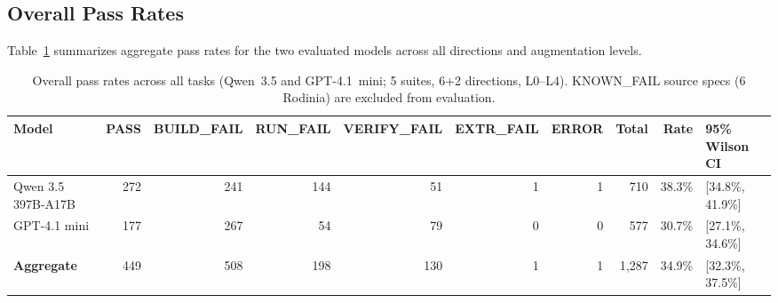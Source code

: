 \documentclass[conference]{IEEEtran}
\begin{document}
\subsection{Overall Pass Rates}
\label{sec:overall-pass}

Table~\ref{tab:overall-pass} summarizes aggregate pass rates for the two evaluated models across all directions and augmentation levels.

\begin{table}[t]
\centering
\caption{Overall pass rates across all tasks (Qwen~3.5 and GPT-4.1~mini; 5 suites, 6+2 directions, L0--L4). KNOWN\_FAIL source specs (6 Rodinia) are excluded from evaluation.}
\label{tab:overall-pass}
\small
\begin{tabular}{@{}lrrrrrrrrl@{}}
\toprule
Model & PASS & BUILD\_FAIL & RUN\_FAIL & VERIFY\_FAIL & EXTR\_FAIL & ERROR & Total & Rate & 95\% Wilson CI \\
\midrule
Qwen 3.5 397B-A17B & 272 & 241 & 144 & 51 & 1 & 1 & 710 & 38.3\% & [34.8\%, 41.9\%] \\ %
GPT-4.1 mini & 177 & 267 & 54 & 79 & 0 & 0 & 577 & 30.7\% & [27.1\%, 34.6\%] \\ %
\textbf{Aggregate} & 449 & 508 & 198 & 130 & 1 & 1 & 1{,}287 & 34.9\% & [32.3\%, 37.5\%] \\ %
\bottomrule
\end{tabular}
\end{table}
\end{document}
